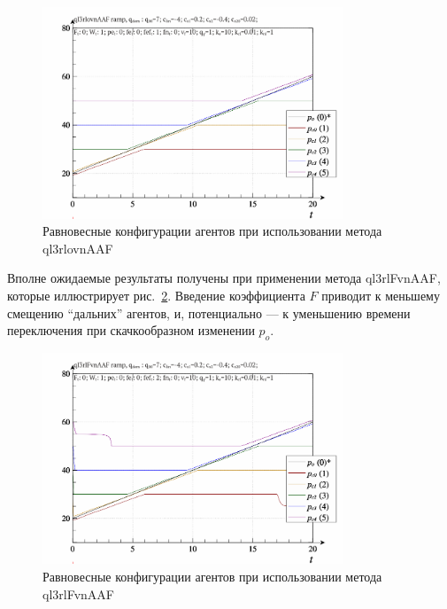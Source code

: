 \begin{figure}[htb!]
  \begin{center}
    \includegraphics[width=0.8\textwidth]{p/ramp/qls-p_t_pi_ql3rlovnAAF_ramp.png}
  \end{center}
  \caption{Равновесные конфигурации агентов при использовании метода ql3rlovnAAF}
  \label{atu:f:qls_ramp_ql3rlovnAAF}
\end{figure}

Вполне ожидаемые результаты получены при применении
метода ql3rlFvnAAF, которые иллюстрирует
рис.~\ref{atu:f:qls_ramp_ql3rlFvnAAF}.
Введение коэффициента $F$ приводит к меньшему смещению ``дальних''
агентов, и, потенциально --- к уменьшению
времени переключения при скачкообразном изменении $p_o$.

\begin{figure}[htb!]
  \begin{center}
    \includegraphics[width=0.8\textwidth]{p/ramp/qls-p_t_pi_ql3rlFvnAAF_ramp.png}
  \end{center}
  \caption{Равновесные конфигурации агентов при использовании метода ql3rlFvnAAF}
  \label{atu:f:qls_ramp_ql3rlFvnAAF}
\end{figure}


